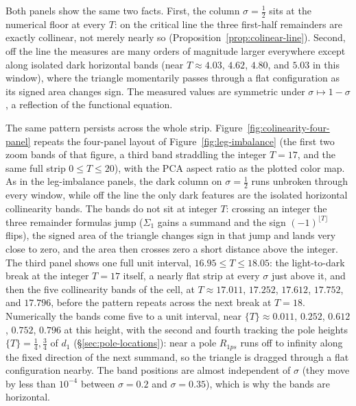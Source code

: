 \documentclass[11pt]{article}
\theoremstyle{definition}
\begin{document}
Both panels show the same two facts. First, the column $\sigma=\tfrac12$
sits at the numerical floor at every $T$: on the critical line the three
first-half remainders are exactly collinear, not merely nearly so
(Proposition~\ref{prop:colinear-line}). Second,
off the line the measures are many orders of magnitude larger everywhere
except along isolated dark horizontal bands (near $T\approx4.03$, $4.62$,
$4.80$, and $5.03$ in this window), where the triangle momentarily passes
through a flat configuration as its signed area changes sign. The measured
values are symmetric under $\sigma\mapsto1-\sigma$, a reflection of the
functional equation.

The same pattern persists across the whole strip.
Figure~\ref{fig:colinearity-four-panel} repeats the four-panel layout of
Figure~\ref{fig:leg-imbalance} (the first two zoom bands of that figure, a
third band straddling the integer $T=17$, and the same full strip
$0\le T\le20$), with the PCA aspect ratio as the plotted color map.
As in the leg-imbalance panels, the dark column on $\sigma=\tfrac12$ runs
unbroken through every window, while off the line the only dark features are
the isolated horizontal collinearity bands. The bands do not sit at integer
$T$: crossing an integer the three remainder formulas jump ($\Sigma_1$ gains
a summand and the sign $(-1)^{\lfloor T\rfloor}$ flips), the signed area of
the triangle changes sign in that jump and lands very close to zero, and the
area then crosses zero a short distance above the integer. The third panel
shows one full unit interval, $16.95\le T\le18.05$: the light-to-dark break
at the integer $T=17$ itself, a nearly flat strip at every $\sigma$ just
above it, and then the five collinearity bands of the cell, at
$T\approx17.011$, $17.252$, $17.612$, $17.752$, and $17.796$, before the
pattern repeats across the next break at $T=18$. Numerically the bands come
five to a unit interval, near $\{T\}\approx0.011$, $0.252$, $0.612$,
$0.752$, $0.796$
at this height, with the second and fourth tracking the pole heights
$\{T\}=\tfrac14,\tfrac34$ of $d_1$ (\S\ref{sec:pole-locations}): near a pole
$R_{1ps}$ runs off to infinity along the fixed direction of the next
summand, so the triangle is dragged through a flat configuration nearby.
The band positions are almost independent of $\sigma$ (they move by less
than $10^{-4}$ between $\sigma=0.2$ and $\sigma=0.35$), which is why the
bands are horizontal.
\end{document}

